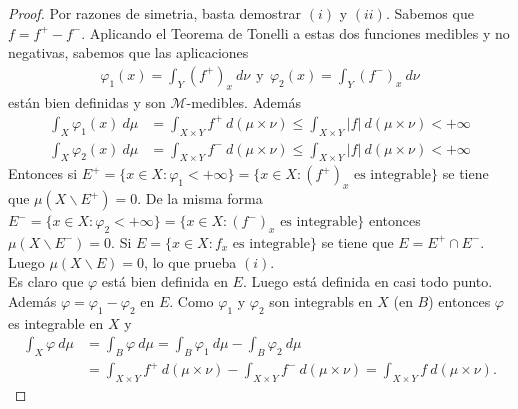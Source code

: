 \begin{proof}
Por razones de simetria, basta demostrar $(i)$ y $(ii)$. Sabemos que $f = f^+ - f^-$. Aplicando el Teorema de Tonelli a estas dos funciones medibles y no negativas, sabemos que las aplicaciones
\begin{align*}
    \varphi_1(x) = \int_{Y}{(f^+)_x \ d\nu} \ \ \text{y} \ \ \varphi_2(x) = \int_{Y}{(f^-)_x \ d\nu}
\end{align*}
están bien definidas y son $\mathcal{M}$-medibles. Además
\begin{align*}
    \int_{X}{\varphi_1(x) \ d\mu} &= \int_{X \times Y}{f^+ \ d(\mu \times \nu)} \leq \int_{X \times Y}{|f| \ d(\mu \times \nu)} < +\infty \\
    \int_{X}{\varphi_2(x) \ d\mu} &= \int_{X \times Y}{f^- \ d(\mu \times \nu)} \leq \int_{X \times Y}{|f| \ d(\mu \times \nu)} < +\infty
\end{align*}
Entonces si $E^+ = \{x \in X : \varphi_1 < +\infty\} = \{ x \in X : (f^+)_x \text{ es integrable}\}$ se tiene que $\mu(X \backslash E^+) = 0$. De la misma forma $E^- = \{x \in X : \varphi_2 < +\infty\} = \{ x \in X : (f^-)_x \text{ es integrable}\}$ entonces $\mu(X \backslash E^-) = 0$. Si $E = \{x \in X : f_x \text{ es integrable}\}$ se tiene que $E = E^+  \cap E^-$. Luego $\mu(X \backslash E) = 0$, lo que prueba $(i)$.
\\
\newline
Es claro que $\varphi$ está bien definida en $E$. Luego está definida en casi todo punto. Además $\varphi = \varphi_1 - \varphi_2$ en $E$. Como $\varphi_1$ y $\varphi_2$ son integrabls en $X$ (en $B$) entonces $\varphi$ es integrable en $X$ y 
\begin{align*}
    \int_{X}{\varphi \ d\mu} &= \int_{B}{\varphi \ d\mu} = \int_{B}{\varphi_1 \ d\mu} - \int_{B}{\varphi_2 \ d\mu} \\
    &= \int_{X \times Y}{f^+ \ d(\mu \times \nu)} - \int_{X \times Y}{f^- \ d(\mu \times \nu)} = \int_{X \times Y}{f \ d(\mu \times \nu)}.
\end{align*}
\end{proof}

